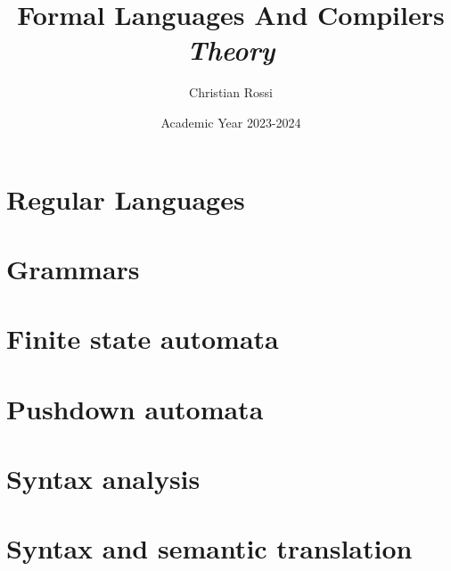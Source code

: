 \documentclass[12pt, a4paper]{report}
\title{Formal Languages And Compilers \\ \textit{Theory}}
\author{Christian Rossi}
\date{Academic Year 2023-2024}
\begin{document}
    \maketitle

    

    \cleardoublepage

    \tableofcontents

    \cleardoublepage

    \chapter{Regular Languages}
    
    
    
    

    \chapter{Grammars}
    
    
    
    
    
    
    
    
    
    
    
    

    \chapter{Finite state automata}
    
    
    
    
    
    
    
    

    \chapter{Pushdown automata}
    
    

    \chapter{Syntax analysis}
    
    
    
    
    

    \chapter{Syntax and semantic translation}
    
    
    
    
    
\end{document}
